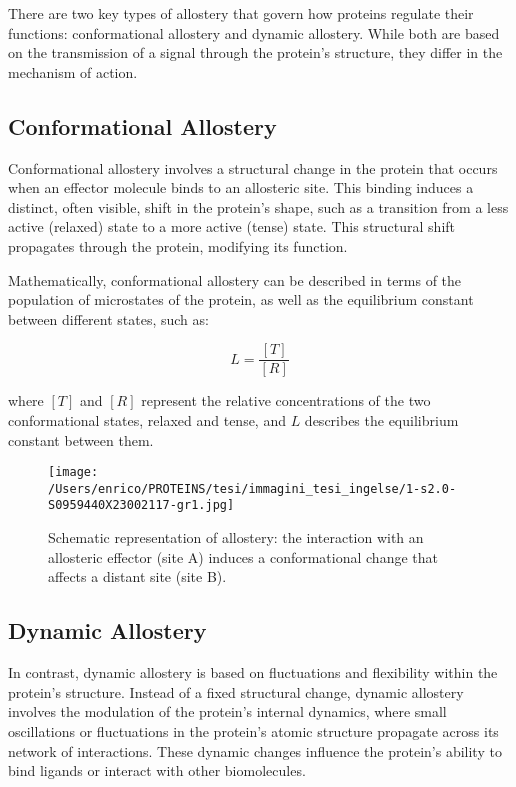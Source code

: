 \documentclass[English, Lau, oneside]{sapthesis}
\begin{document}
There are two key types of allostery that govern how proteins regulate their functions: conformational allostery and dynamic allostery. While both are based on the transmission of a signal through the protein’s structure, they differ in the mechanism of action.

\subsection{Conformational Allostery}  
\noindent Conformational allostery involves a structural change in the protein that occurs when an effector molecule binds to an allosteric site. This binding induces a distinct, often visible, shift in the protein’s shape, such as a transition from a less active (relaxed) state to a more active (tense) state. This structural shift propagates through the protein, modifying its function.

Mathematically, conformational allostery can be described in terms of the population of microstates of the protein, as well as the equilibrium constant between different states, such as:

\[
L = \frac{[T]}{[R]}
\]

where \([T]\) and \([R]\) represent the relative concentrations of the two conformational states, relaxed and tense, and \(L\) describes the equilibrium constant between them.

\begin{figure}[h]
    \centering
    \texttt{[image: /Users/enrico/PROTEINS/tesi/immagini\_tesi\_ingelse/1-s2.0-S0959440X23002117-gr1.jpg]}
    \caption{Schematic representation of allostery: the interaction with an allosteric effector (site A) induces a conformational change that affects a distant site (site B).}
    \label{fig:allostery_dynamics}
\end{figure}

\subsection{Dynamic Allostery}  
\noindent In contrast, dynamic allostery is based on fluctuations and flexibility within the protein’s structure. Instead of a fixed structural change, dynamic allostery involves the modulation of the protein’s internal dynamics, where small oscillations or fluctuations in the protein’s atomic structure propagate across its network of interactions. These dynamic changes influence the protein's ability to bind ligands or interact with other biomolecules.
\end{document}
